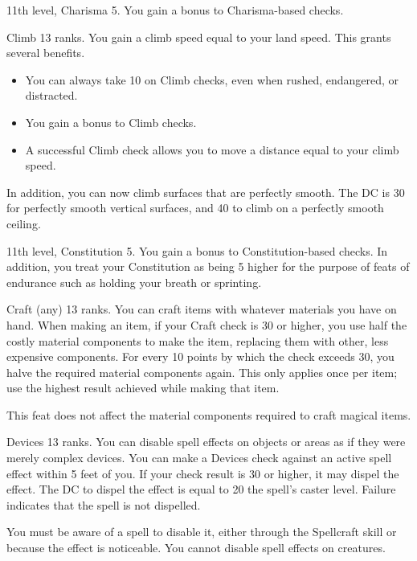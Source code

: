 \featpre 11th level, Charisma 5.
\featben You gain a  bonus to Charisma-based checks.

\featpre Climb 13 ranks.
\featben You gain a climb speed equal to your land speed. This grants several benefits.
\begin{itemize}
    \item You can always take 10 on Climb checks, even when rushed, endangered, or distracted.
    \item You gain a  bonus to Climb checks.
    \item A successful Climb check allows you to move a distance equal to your climb speed.
\end{itemize}

In addition, you can now climb surfaces that are perfectly smooth. The DC is 30 for perfectly smooth vertical surfaces, and 40 to climb on a perfectly smooth ceiling.

\featpre 11th level, Constitution 5.
\featben You gain a  bonus to Constitution-based checks. In addition, you treat your Constitution as being 5 higher for the purpose of feats of endurance such as holding your breath or sprinting.

\featpre Craft (any) 13 ranks.
\featben You can craft items with whatever materials you have on hand. When making an item, if your Craft check is 30 or higher, you use half the costly material components to make the item, replacing them with other, less expensive components. For every 10 points by which the check exceeds 30, you halve the required material components again. This only applies once per item; use the highest result achieved while making that item.

This feat does not affect the material components required to craft magical items.

\featpre Devices 13 ranks.
\featben You can disable spell effects on objects or areas as if they were merely complex devices. You can make a Devices check against an active spell effect within 5 feet of you. If your check result is 30 or higher, it may dispel the effect. The DC to dispel the effect is equal to 20 \add the spell's caster level. Failure indicates that the spell is not dispelled.

You must be aware of a spell to disable it, either through the Spellcraft skill or because the effect is noticeable. You cannot disable spell effects on creatures.

